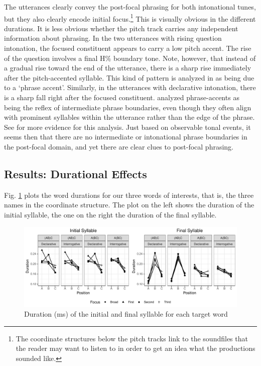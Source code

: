 \documentclass[preprint,review,12pt,authoryear,times]{elsarticle}
\begin{document}
The utterances clearly convey the post-focal phrasing for both intonational tunes, but they also clearly encode initial focus.\footnote{The coordinate structures below the pitch tracks link to the soundfiles that the reader may want to listen to in order to get an idea what the productions sounded like.} This is visually obvious in the different durations. It is less obvious whether the pitch track carries any independent information about phrasing. In the two utterances with rising question intonation, the focused constituent appears to carry a low pitch accent. The rise of the question involves a final H\% boundary tone. Note, however, that instead of a gradual rise toward the end of the utterance, there is a sharp  rise  immediately after the pitch-accented syllable. This kind of pattern is analyzed in \citet{pierr80} as being due to a `phrase accent'. Similarly, in the utterances with declarative intonation, there is a sharp fall right after the focused constituent. \citet{pierr80} analyzed phrase-accents as being the reflex of intermediate phrase boundaries, even though they often align with prominent syllables within the utterance rather than the edge of the phrase. See \citep{grice00} for more evidence for this analysis. Just based on observable tonal events, it seems then that there are no intermediate or intonational phrase boundaries in the post-focal domain, and yet there are clear clues to post-focal phrasing. 


\subsection{Results: Durational Effects}

Fig. \ref{figureDuration} plots the word durations for our three words of interests, that is, the three names in the coordinate structure. The plot on the left  shows the duration of the initial syllable, the one on the right the duration of the final syllable. 

\begin{figure}[ht!]
	\begin{center}
		\includegraphics[width=5.4in]{Figures/syllable_duration.pdf}
		\caption{Duration (ms) of the initial and final syllable for each target word}
		\label{figureDuration}
	\end{center} 
\end{figure}
\end{document}
